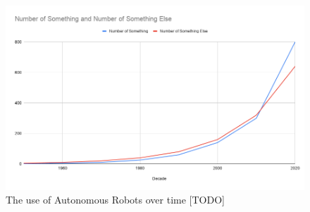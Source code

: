 
\begin{figure}%
\begin{center}
\includegraphics[width=0.8\linewidth]{img/sampleLineGraph.png}
\caption{The use of Autonomous Robots over time [TODO]}
\label{fig:useOfAutonomousRobots}
\end{center}
\end{figure}
